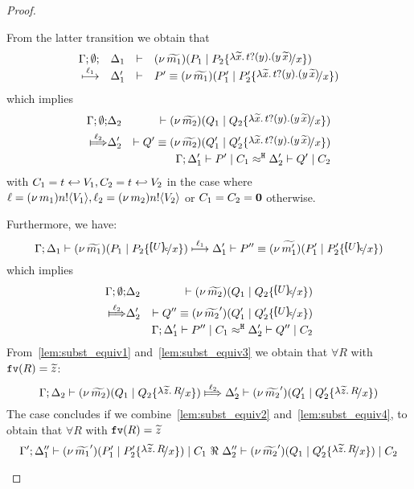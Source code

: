\begin{proof}
\begin{enumerate}
	\noi From the latter transition we obtain that
%
\[
		\mhorel{\Gamma}{\Delta_1}{\newsp{\widetilde{m_1}}{P_1 \Par P_2 \subst{\auxtr{t}}{x}}}
		{\hby{\ell_1}}{\Delta_1'}{P' \scong}{\newsp{\widetilde{m_1}}{P_1' \Par P_2' \subst{\auxtr{t}}{x}}}
\]
%
	\noi which implies
%
	\begin{eqnarray}
		\Gamma; \es; &\Delta_2& \proves \newsp{\widetilde{m_2}}{Q_1 \Par Q_2 \subst{\auxtr{t}}{x}} \nonumber \\
		\Hby{\ell_2}&
		\Delta_2'& \proves Q' \scong \newsp{\widetilde{m_2}}{Q_1' \Par Q_2' \subst{\auxtr{t}}{x}}
		\label{lem:subst_equiv1}
		\\
		&&\horel{\Gamma}{\Delta_1'}{P' \Par C_1}{\hwb}{\Delta_2'}{Q' \Par C_2} \label{lem:subst_equiv2}
	\end{eqnarray}
%
	\noi with $C_1 = t \hookleftarrow V_1, C_2 = t \hookleftarrow V_2$
	in the case where $\ell = (\nu\, m_1)n ! \langle V_1 \rangle, \ell_2 = (\nu\, m_2)n ! \langle V_2 \rangle$ or $C_1 = C_2 = \mathbf{0}$ otherwise.   
 
	\noi Furthermore, we have:
%
\[
	\horel{\Gamma}{\Delta_1}{\newsp{\widetilde{m_1}}{P_1 \Par P_2 \subst{\omapchar{U}}{x}}}{\hby{\ell_1}}
	{\Delta_1'}{P'' \scong \newsp{\widetilde{m_1'}}{P_1' \Par P_2' \subst{\omapchar{U}}{x}}}
\]
%
	\noi which implies
%
	\begin{eqnarray}
		\Gamma; \es; &\Delta_2& \proves \newsp{\widetilde{m_2}}{Q_1 \Par Q_2 \subst{\omapchar{U}}{x}} \nonumber \\
		\Hby{\ell_2} &\Delta_2'& \proves  Q'' \scong \newsp{\widetilde{m_2}'}{Q_1' \Par Q_2' \subst{\omapchar{U}}{x}}
		\label{lem:subst_equiv3}
		\\
		&&\horel{\Gamma}{\Delta_1'}{P'' \Par C_1}{\hwb}{\Delta_2'}{Q'' \Par C_2} \label{lem:subst_equiv4}
	\end{eqnarray}
%
	\noi From~\eqref{lem:subst_equiv1} and~\eqref{lem:subst_equiv3} we obtain that $\forall R$ with $\mathtt{fv}(R) = \widetilde{z}$:
%
	\[
		\horel{\Gamma}{\Delta_2}{\newsp{\widetilde{m_2}}{Q_1 \Par Q_2 \subst{\abs{\widetilde{z}}{R}}{x}}}
		{\Hby{\ell_2}}
		{\Delta_2'}{\newsp{\widetilde{m_2}'}{Q_1' \Par Q_2' \subst{\abs{\widetilde{z}}{R}}{x}}}
	\]
%
	\noi The case concludes if we combine~\eqref{lem:subst_equiv2} and~\eqref{lem:subst_equiv4}, to obtain that $\forall R$ with $\mathtt{fv}(R) = \widetilde{z}$
%
	\[
		\horel{\Gamma'}{\Delta_1''}{\newsp{\widetilde{m_1}'}{P_1' \Par P_2' \subst{\abs{\widetilde{z}}{R}}{x}} \Par C_1}
		{\ \Re\ }
		{\Delta_2''}{\newsp{\widetilde{m_2}'}{Q_1 \Par Q_2' \subst{\abs{\widetilde{z}}{R}}{x}} \Par C_2}
	\]


\end{enumerate}
\end{proof}
